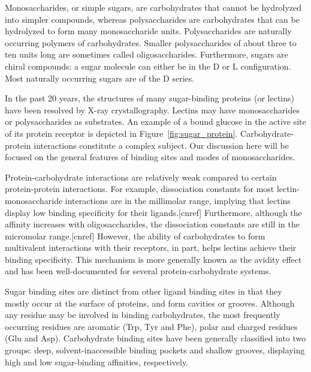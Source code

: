 Monosaccharides, or simple sugars, are carbohydrates that cannot be hydrolyzed into simpler compounds, whereas polysaccharides are carbohydrates that can be hydrolyzed to form many monosaccharide units. Polysaccharides are naturally occurring polymers of carbohydrates. Smaller polysaccharides of about three to ten units long are sometimes called oligosaccharides.  Furthermore, sugars are chiral compounds: a sugar molecule can either be in the D or L configuration. Most naturally occurring sugars are of the D series.

In the past 20 years, the structures of many sugar-binding proteins (or lectins) have been resolved by X-ray crystallography.\cite{Rini:1995p2497} Lectins may have monosaccharides or polysaccharides as substrates. An example of a bound glucose in the active site of its protein receptor is depicted in Figure~\ref{fig:sugar_protein}. Carbohydrate-protein interactions constitute a complex subject. Our discussion here will be focused on the general features of binding sites and modes of monosaccharides. 

Protein-carbohydrate interactions are relatively weak compared to certain protein-protein interactions. For example, dissociation constants for most lectin-monosaccharide interactions are in the millimolar range, implying that lectins display low binding specificity for their ligands.[cnref] Furthermore, although the affinity increases with oligosaccharides, the dissociation constants are still in the micromolar range.[cnref] However, the ability of carbohydrates to form multivalent interactions with their receptors, in part, helps lectins achieve their binding specificity.  This mechanism is more generally known as the avidity effect and has been well-documented for several protein-carbohydrate systems.\cite{Rini:1995p2497}

Sugar binding sites are distinct from other ligand binding sites in that they mostly occur at the surface of proteins, and form cavities or grooves. Although any residue may be involved in binding carbohydrates, the most frequently occurring residues are aromatic (Trp, Tyr and Phe), polar and charged residues (Glu and Asp).\cite{Vyas:1991p6498} Carbohydrate binding sites have been generally classified into two groups: deep, solvent-inaccessible binding pockets and shallow grooves, displaying high and low sugar-binding affinities, respectively.\cite{Vyas:1991p6498,Rini:1995p2497}

